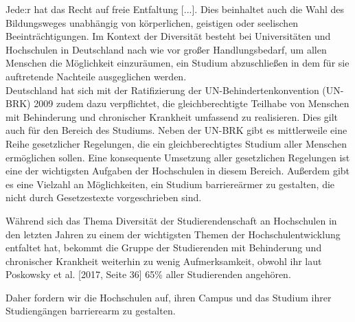 \documentclass[DIV=calc]{scrartcl}
\let\oldgrqq=\grqq
\def\grqq{\oldgrqq\xspace}
\begin{document}
\glqq Jede:r hat das Recht auf freie Entfaltung [...]\grqq [Art 2 GG]. Dies beinhaltet auch die Wahl des Bildungsweges unabhängig von körperlichen, geistigen oder seelischen Beeinträchtigungen. Im Kontext der Diversität besteht bei Universitäten und Hochschulen in Deutschland nach wie vor großer Handlungsbedarf, um allen Menschen die Möglichkeit einzuräumen, ein Studium abzuschließen in dem für sie auftretende Nachteile ausgeglichen werden. \\
Deutschland hat sich mit der Ratifizierung der UN-Behindertenkonvention (UN-BRK) 2009  zudem dazu verpflichtet, die gleichberechtigte Teilhabe von Menschen mit Behinderung und chronischer Krankheit umfassend zu realisieren. Dies gilt auch für den Bereich des Studiums. Neben der UN-BRK  gibt es mittlerweile eine Reihe gesetzlicher Regelungen, die ein gleichberechtigtes Studium aller Menschen ermöglichen sollen. %
Eine konsequente Umsetzung aller gesetzlichen Regelungen ist eine der wichtigsten Aufgaben der Hochschulen in diesem Bereich. Außerdem gibt es eine Vielzahl an Möglichkeiten, ein Studium barriereärmer zu gestalten, die nicht durch Gesetzestexte vorgeschrieben sind.

Während sich das Thema Diversität der Studierendenschaft an Hochschulen in den letzten Jahren zu einem der wichtigsten Themen der Hochschulentwicklung entfaltet hat, bekommt die Gruppe der Studierenden mit Behinderung und chronischer Krankheit weiterhin zu wenig Aufmerksamkeit, obwohl ihr laut Poskowsky et al. [2017, Seite 36] 65\% aller Studierenden angehören. 

Daher fordern wir die Hochschulen auf, ihren Campus und das Studium ihrer Studiengängen barrierearm zu gestalten. 
\end{document}
